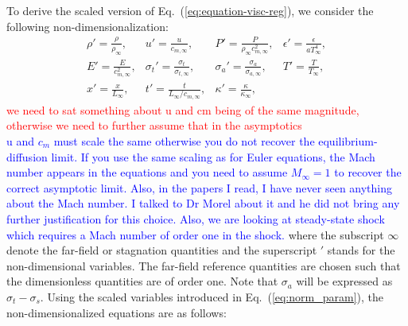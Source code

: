 \documentclass[review]{elsarticle}
\newcommand{\eqt}[1]{Eq.~(\ref{#1})}                     %
\newcommand{\tcr}[1]{\textcolor{red}{#1}}
\newcommand{\tcb}[1]{\textcolor{blue}{#1}}
\begin{document}
To derive the scaled version of \eqt{eq:equation-visc-reg}, we consider the following non-dimensionalization:
%
\begin{equation}
\label{eq:norm_param}
\begin{array}{llll}
\rho'   = \frac{\rho}{\rho_\infty}           , & 
u'      = \frac{u}{c_{m,\infty}}                 , & 
P'      = \frac{P}{\rho_\infty c^2_{m,\infty}}   , & 
\epsilon'      = \frac{\epsilon}{a T_\infty^4 }              , \\
E'      = \frac{E}{c^2_{m,\infty} }              , & 
\sigma_t'      = \frac{\sigma_t}{\sigma_{t,\infty} }              , & 
\sigma_a'      = \frac{\sigma_a}{\sigma_{a,\infty} }              , & 
T'      = \frac{T}{T_\infty }              , \\
x' = \frac{x}{L_\infty}                      , & 
t' = \frac{t}{L_\infty / c_{m,\infty}}       , &  
\kappa' = \frac{\kappa}{\kappa_\infty}       ,
\end{array}
\end{equation}
%
\tcr{we need to sat something about u and cm being of the same magnitude, otherwise we need to further assume that in the asymptotics\\}
\tcb{u and $c_m$ must scale the same otherwise you do not recover the equilibrium-diffusion limit. If you use the same scaling as for Euler equations, the Mach number appears in the equations and you need to assume $M_\infty = 1$ to recover the correct asymptotic limit. Also, in the papers I read, I have never seen anything about the Mach number. I talked to Dr Morel about it and he did not bring any further justification for this choice. Also, we are looking at steady-state shock which requires a Mach number of order one in the shock.}
where  the subscript $\infty$ denote the far-field or stagnation quantities and the superscript $'$ 
stands for the non-dimensional variables. The far-field reference quantities are chosen such that the 
dimensionless quantities are of order one. Note that $\sigma_a$ will be expressed as $\sigma_t - \sigma_s$.  Using the scaled variables introduced in \eqt{eq:norm_param}, the non-dimensionalized equations are as follows:
%
\end{document}
